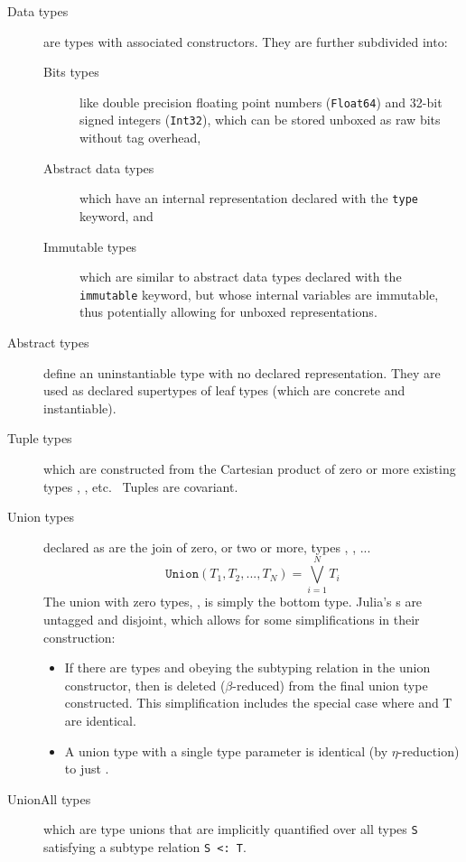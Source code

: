 \documentclass[pldi]{sigplanconf-pldi15}
\begin{document}
\begin{description}

\item[Data types] are types with associated constructors. They
	are further subdivided into:
	\begin{description}
	
	\item[Bits types] like double precision floating point numbers
	(\verb|Float64|) and 32-bit signed integers (\verb|Int32|), which can
	be stored unboxed as raw bits without tag overhead,

	\item[Abstract data types] which have an internal representation
		declared with the \verb|type| keyword, and
		
	\item[Immutable types] which are similar to abstract data types
		declared with the \verb|immutable| keyword, but whose internal
		variables are immutable, thus potentially allowing for unboxed
		representations.

	\end{description}

\item[Abstract types] define an uninstantiable type with no declared
	representation. They are used as declared supertypes of leaf types
	(which are concrete and instantiable).

\item[Tuple types]  which are constructed from the Cartesian
	product of zero or more existing types , ,
	etc.~\cite[Sec. 11.7]{Pierce2002} Tuples are covariant.

\item[Union types] declared as  are the join of zero,
	or two or more, types , , ...~\cite[Sec.
	15.7]{Pierce2002}
	\begin{equation}
		\texttt{Union}(T_1, T_2, ..., T_N) = \bigvee_{i=1}^N T_i 
	\end{equation}
	The union with zero types, , is simply the bottom type.
	Julia's s are untagged and disjoint, which allows for some
	simplifications in their construction:
	\begin{itemize}
		\item If there are types  and  obeying the
			subtyping relation  in the union
			constructor, then  is deleted ($\beta$-reduced)
			from the final union type constructed. This
			simplification includes the special case where 
			and \code T are identical.

		\item A union type  with a single type parameter
			 is identical (by $\eta$-reduction) to just
			.
	\end{itemize}

\item[UnionAll types] which are type unions that are implicitly quantified over
	all types \verb|S| satisfying a subtype relation \verb|S <: T|.

\end{description}
\end{document}
